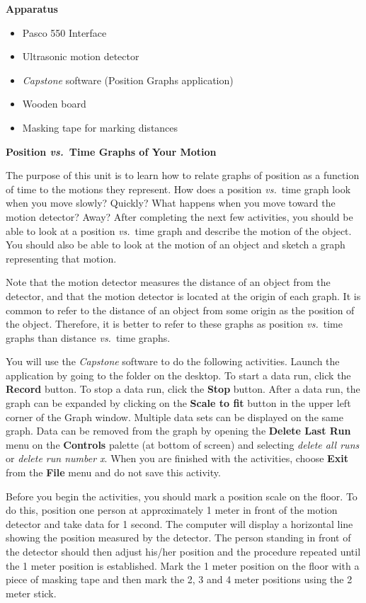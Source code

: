 \textbf{Apparatus} 

\begin{itemize}
\item Pasco 550 Interface
\item Ultrasonic motion detector 
\item \textit{Capstone} software (Position Graphs application)
\item Wooden board
\item Masking tape for marking distances
\end{itemize}
\textbf{Position \textit{vs.}~Time Graphs of Your Motion }

The purpose of this unit is to learn how to relate graphs of position as a function
of time to the motions they represent. How does a position \textit{vs.}~time graph look
when you move slowly? Quickly? What happens when you move toward the motion
detector? Away? After completing the next few activities, you should be able
to look at a position \textit{vs.}~time graph and describe the motion of the object.
You should also be able to look at the motion of an object and sketch a graph
representing that motion.

Note that the motion detector measures the distance of an object from the detector,
and that the motion detector is located at the origin of each graph. It is common
to refer to the distance of an object from some origin as the position of the
object. Therefore, it is better to refer to these graphs as position \textit{vs.}~time
graphs than distance \textit{vs.}~time graphs.

You will use the \textit{Capstone} software to do the following activities.
Launch the  application by going to the \filename{\coursefolder} folder on the desktop. 
To start a data run, click the \textbf{Record} button. To stop a data run,
click the \textbf{Stop} button. After a data run, the graph can be expanded
by clicking on the \textbf{Scale to fit} button in the upper left corner of
the Graph window. Multiple data sets can be displayed on the same graph. Data
can be removed from the graph by opening the \textbf{Delete Last Run} menu on the \textbf{Controls} palette 
 (at bottom of screen) and selecting \textit{delete all runs} or \textit{delete run number x}.
  When you are finished with the activities, choose \textbf{Exit} from the \textbf{File} menu
and do not save this activity.

Before you begin the activities, you should mark a position scale on the floor.
To do this, position one person at approximately 1 meter in front of the motion
detector and take data for 1 second. The computer will display a horizontal
line showing the position measured by the detector. The person standing in front
of the detector should then adjust his/her position and the procedure repeated
until the 1 meter position is established. Mark the 1 meter position on the
floor with a piece of masking tape and then mark the 2, 3 and 4 meter positions
using the 2 meter stick.


